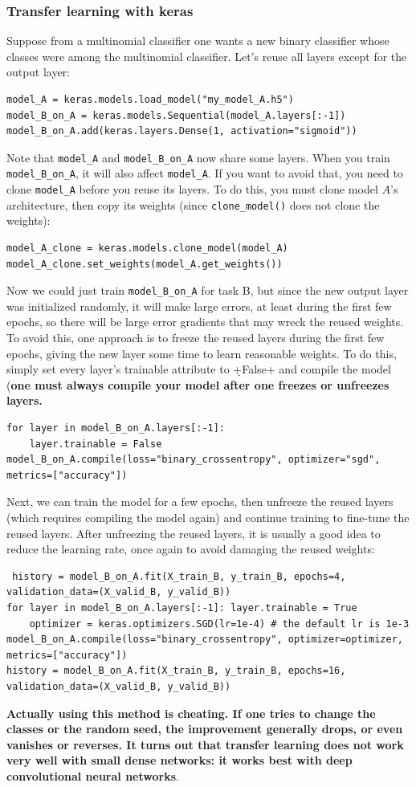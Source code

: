 \documentclass[12pt, letterpaper]{article}
\theoremstyle{definition}
\let\tb\textbf
\let\cd\lstinline
\begin{document}
\subsubsection{Transfer learning with keras}
Suppose from a multinomial classifier one wants a new binary classifier whose classes were among the multinomial classifier. Let's reuse all layers except for the output layer:
\begin{lstlisting}
model_A = keras.models.load_model("my_model_A.h5")
model_B_on_A = keras.models.Sequential(model_A.layers[:-1])
model_B_on_A.add(keras.layers.Dense(1, activation="sigmoid"))
\end{lstlisting}
Note that \cd+model_A+ and \cd+model_B_on_A+ now share some layers. When you train \cd+model_B_on_A+, it will also affect \cd+model_A+. If you want to avoid that, you need to clone \cd+model_A+ before you reuse its layers. To do this, you must clone model $A$'s architecture, then copy its weights (since \cd+clone_model()+ does not clone the weights):
\begin{lstlisting}
model_A_clone = keras.models.clone_model(model_A)
model_A_clone.set_weights(model_A.get_weights())
\end{lstlisting}
Now we could just train \cd+model_B_on_A+ for task B, but since the new output layer was initialized randomly, it will make large errors, at least during the first few epochs, so there will be large error gradients that may wreck the reused weights. To avoid this, one approach is to freeze the reused layers during the first few epochs, giving the new layer some time to learn reasonable weights. To do this, simply set every layer's trainable attribute to \d+False+ and compile the model (\tb{one must always compile your model after one freezes or unfreezes layers.}
\begin{lstlisting}
for layer in model_B_on_A.layers[:-1]:
    layer.trainable = False
model_B_on_A.compile(loss="binary_crossentropy", optimizer="sgd", metrics=["accuracy"])
\end{lstlisting}
Next, we can train the model for a few epochs, then unfreeze the reused layers (which requires compiling the model again) and continue training to fine-tune the reused layers. After unfreezing the reused layers, it is usually a good idea to reduce the learning rate, once again to avoid damaging the reused weights:
\begin{lstlisting}
 history = model_B_on_A.fit(X_train_B, y_train_B, epochs=4, validation_data=(X_valid_B, y_valid_B))
for layer in model_B_on_A.layers[:-1]: layer.trainable = True
    optimizer = keras.optimizers.SGD(lr=1e-4) # the default lr is 1e-3 model_B_on_A.compile(loss="binary_crossentropy", optimizer=optimizer, metrics=["accuracy"])
history = model_B_on_A.fit(X_train_B, y_train_B, epochs=16, validation_data=(X_valid_B, y_valid_B))
\end{lstlisting}
\tb{Actually using this method is cheating. If one tries to change the classes or the random seed, the improvement generally drops, or even vanishes or reverses. It turns out that transfer learning does not work very well with small dense networks: it works best with deep convolutional neural networks}.
\end{document}
